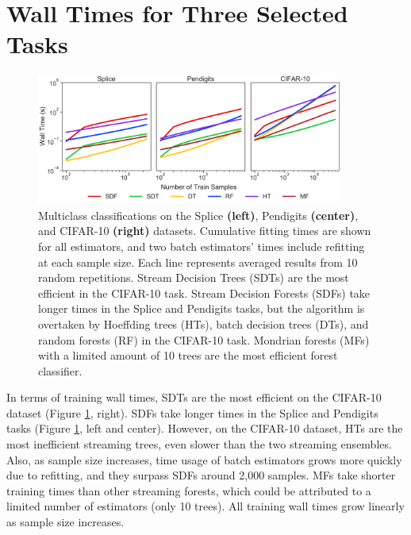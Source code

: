 \section{Wall Times for Three Selected Tasks}
\label{app:select_time}

\begin{figure}[!htb]
\centering
\includegraphics[width=0.9\textwidth]{select_time}
  \caption{Multiclass classifications on the Splice \textbf{(left)}, Pendigits \textbf{(center)}, and CIFAR-10 \textbf{(right)} datasets. Cumulative fitting times are shown for all estimators, and two batch estimators' times include refitting at each sample size. Each line represents averaged results from 10 random repetitions. Stream Decision Trees (SDTs) are the most efficient in the CIFAR-10 task. Stream Decision Forests (SDFs) take longer times in the Splice and Pendigits tasks, but the algorithm is overtaken by Hoeffding trees (HTs), batch decision trees (DTs), and random forests (RF) in the CIFAR-10 task. Mondrian forests (MFs) with a limited amount of 10 trees are the most efficient forest classifier.
  }
\label{fig:select_time}
\end{figure}

In terms of training wall times, SDTs are the most efficient on the CIFAR-10 dataset (Figure \ref{fig:select_time}, right). 
SDFs take longer times in the Splice and Pendigits tasks (Figure \ref{fig:select_time}, left and center). However, on the CIFAR-10 dataset, HTs are the most inefficient streaming trees, even slower than the two streaming ensembles. Also, as sample size increases, time usage of batch estimators grows more quickly due to refitting, and they surpass SDFs around 2,000 samples. MFs take shorter training times than other streaming forests, which could be attributed to a limited number of estimators (only 10 trees). All training wall times grow linearly as sample size increases.